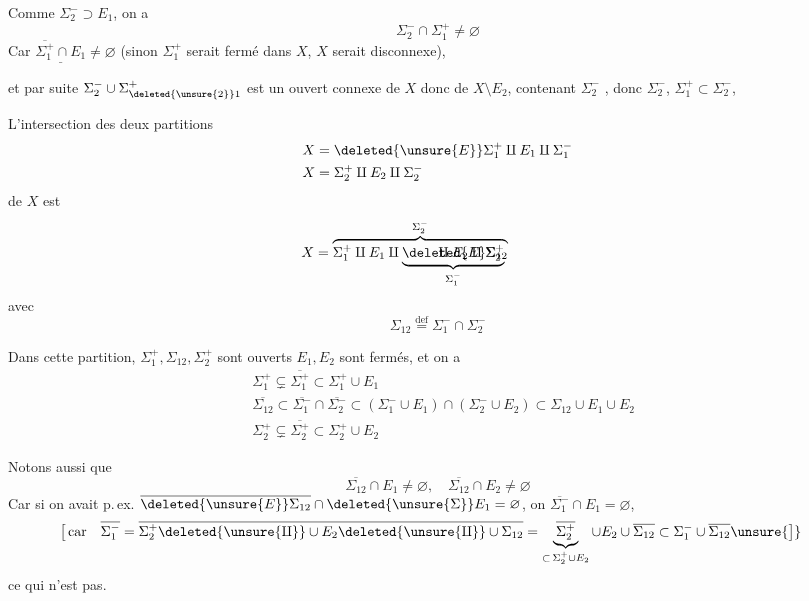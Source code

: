 Comme  $\Sigma_2^-\supset E_1$,   on a
\reversemarginpar
{}
\normalmarginpar
\[
 \Sigma_2^-\cap\Sigma_1^+\ne\varnothing
\]
Car $\underline{\overline{\Sigma_1^+}\cap E_1}\ne\varnothing$ (sinon  $\Sigma_1^+$ serait  fermé dans $X$,   $X$ serait disconnexe),
\endgroup

et par suite $\Sigma_2^-\cup\Sigma_{\deleted{\unsure{2}}1}^+$  est un ouvert connexe de $X$ donc de $X\setminus E_2$, contenant  $\Sigma_2^-$ , donc    $\Sigma_2^-$,  $\Sigma_1^+\subset\Sigma_2^-$, 

L'intersection des deux partitions
\[
 \begin{aligned}
 X&=\deleted{\unsure{E}}\Sigma_1^+\amalg E_1\amalg\Sigma_1^-\\
 X&=\Sigma_2^+\amalg E_2\amalg\Sigma_2^-
 \end{aligned}
\]
de $X$ est
\[
 X=\overbrace{\Sigma_1^+\amalg E_1\amalg
 \rlap{$\displaystyle\underbrace{\phantom{E\Sigma_{12}}\amalg
 E_2\amalg\Sigma_2^+}_{\Sigma_1^-}$}\deleted{E}\Sigma_{12}}^{\Sigma_2^-}
 \phantom{\amalg E_2\amalg\Sigma_2^+}
\]
avec
\[
 \Sigma_{12}\overset{\text{def}}{=}\Sigma_1^-\cap\Sigma_2^-
\]

Dans cette partition, $\Sigma_1^+,\Sigma_{12},\Sigma_2^+$ sont ouverts $E_1,E_2$ sont fermés, et on a
\[
 \begin{aligned}
 &\Sigma_1^+\subsetneq\overline{\Sigma_1^+}\subset\Sigma_1^+\cup E_1\\
 &\overline{\Sigma_{12}}\subset\overline{\Sigma_1^-}\cap\overline{\Sigma_2^-}\subset
 (\Sigma_1^-\cup E_1)\cap(\Sigma_2^-\cup E_2)\subset\Sigma_{12}\cup E_1\cup E_2\\
 &\Sigma_2^+\subsetneq\overline{\Sigma_2^+}\subset\Sigma_2^+\cup E_2
 \end{aligned}
\]

Notons aussi que
\[
 \overline{\Sigma_{12}}\cap E_1\ne\varnothing,\quad
 \overline{\Sigma_{12}}\cap E_2\ne\varnothing
\]
Car si on avait p.\,ex. $\overline{\deleted{\unsure{E}}\Sigma_{12}}\cap
\deleted{\unsure{\Sigma}}E_1=\varnothing$, on 
 $\overline{\Sigma_1^-}\cap E_1=\varnothing$,
\[
 \begin{aligned}
 \big[\,\text{car}\quad\overline{\Sigma_1^-}&=
 \overline{\Sigma_2^+\deleted{\unsure{\amalg}}\cup E_2
 \deleted{\unsure{\amalg}}\cup\Sigma_{12}}=
 \underbrace{\overline{\Sigma_2^+}}_{\subset\,\Sigma_2^+\cup E_2}\cup E_2
 \cup\overline{\Sigma_{12}}\subset\Sigma_1^-\cup\overline{\Sigma_{12}}\unsure{\big]}
 \end{aligned}
\]
ce qui n'est pas.

